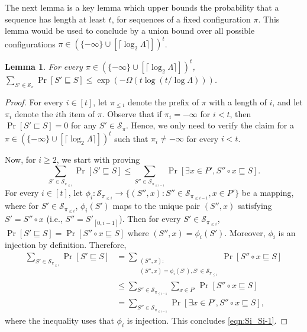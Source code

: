 \documentclass[11pt,letterpaper]{article}
\theoremstyle{plain}
\newtheorem{lemma}[theorem]{Lemma}
\theoremstyle{definition}
\theoremstyle{remark}
\newcommand{\Spi}[1]{\ensuremath{\mathcal{S}_{\pi_{#1}}}\xspace}
\begin{document}
    The next lemma is a key lemma which upper bounds the probability that a sequence has length at least $t$, for sequences of a fixed configuration $\pi$.
    This lemma would be used to conclude  by a union bound over all possible configurations $\pi \in (\{-\infty\} \cup [\lceil\log_2 \Lambda\rceil])^t$.


\begin{lemma}
    \label{lemma:key}
    For every  $\pi\in (\{-\infty\} \cup [\lceil \log_2 \Lambda \rceil])^{t}$, $\sum_{S'\in \mathcal{S}_{\pi}} \Pr[S'\sqsubseteq S]\leq \exp(- \Omega(t\log (t / \log \Lambda)))$. 
\end{lemma}
\begin{proof} 
    For every $i\in [t]$, let $\pi_{\leq i}$ denote the prefix of $\pi$ with a length of $i$, and let $\pi_{i}$ denote the $i$th item of $\pi$.  
    Observe that if $\pi_i = -\infty$ for $i < t$, then $\Pr[S' \sqsubset S] = 0$ for any $S' \in \mathcal{S}_\pi$.
Hence, we only need to verify the claim for a $\pi\in (\{-\infty\} \cup [\lceil \log_2 \Lambda \rceil])^{t}$ such that $\pi_i \neq -\infty$ for every $i < t$.

    Now, for $i  \geq 2$, we start with proving 
    \begin{equation}
    \label{eqn:Si_Si-1}
        \sum_{S'\in\Spi{\leq i}} \Pr[S'\sqsubseteq S] \leq \sum_{S''\in\Spi{\leq i-1}} \Pr[\exists x\in P', S''\circ x\sqsubseteq S].
    \end{equation} 
    For every $i\in [t]$, let $\phi_i: \Spi{\leq i} \to \{(S'', x): S''\in\Spi{\leq i-1}, x\in P'\}$ be a mapping,
    where for $S'\in \Spi{\leq i}$, $\phi_i(S')$ maps to the unique pair $(S'', x)$ satisfying $S' = S''\circ x$ (i.e., $S'' = S'_{[0, i - 1]}$).   
    Then for every $S' \in \Spi{\leq i}$, $\Pr[S' \sqsubseteq S] = \Pr[S'' \circ x \sqsubseteq S]$
    where $(S'', x) = \phi_{i}(S')$.
    Moreover, $\phi_i$ is an injection by definition.
    Therefore,
    \begin{align*}
        \sum_{S'\in\Spi{\leq i}} \Pr[S'\sqsubseteq S]
        &= \sum_{\substack{ (S'', x) :\\
        (S'', x) = \phi_i(S'),S' \in \Spi{\leq i} } } \Pr[S'' \circ x \sqsubseteq S] \\
        &\leq \sum_{S''\in\Spi{\leq i-1}} \sum_{x \in P'} \Pr[S''\circ x\sqsubseteq S] \\
        &= \sum_{S''\in\Spi{\leq i-1}} \Pr[\exists x\in P', S''\circ x\sqsubseteq S],
    \end{align*}
    where the inequality uses that $\phi_i$ is injection.
    This concludes \eqref{eqn:Si_Si-1}.
    

\end{proof}
\end{document}
